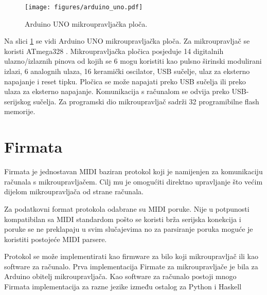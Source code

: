 \begin{figure}[H]
\centering
\texttt{[image: figures/arduino\_uno.pdf]}
\caption{Arduino UNO mikroupravljačka ploča.\protect\footnotemark}
\label{fig:arduino}
\end{figure}


Na slici \ref{fig:arduino} se vidi Arduino UNO mikroupravljačka ploča. Za
mikroupravljač se koristi ATmega328 \cite{atmega}. Mikroupravljačka pločica posjeduje 14
digitalnih ulazno/izlaznih pinova od kojih se 6 mogu koristiti kao pulsno
širinski modulirani izlazi, 6 analognih ulaza, \unit{16}{\mega\hertz} keramički
oscilator, USB sučelje, ulaz za eksterno napajanje i reset tipku. Pločica se
može napajati preko USB sučelja ili preko ulaza za eksterno napajanje.
Komunikacija s računalom se odvija preko USB-serijskog sučelja. Za programski
dio mikroupravljač sadrži \unit{32}{\kilo\byte} programibilne flash memorije.

\newpage
\section{Firmata}

Firmata je jednostavan MIDI baziran protokol koji je namijenjen za komunikaciju
računala s mikroupravljačem. Cilj mu je omogućiti direktno upravljanje što većim
dijelom mikroupravljača od strane računala.

Za podatkovni format protokola odabrane su MIDI \cite{midi} poruke. Nije u
potpunosti kompatibilan sa MIDI standardom pošto se koristi brža serijska
konekcija i poruke se ne preklapaju u svim slučajevima no za parsiranje poruka
moguće je koristiti postojeće MIDI parsere.

Protokol se može implementirati kao firmware za bilo koji mikroupravljač ili kao
software za računalo. Prva implementacija Firmate za mikroupravljače je bila za
Arduino obitelj mikroupravljača. Kao software za računalo postoji mnogo
Firmata implementacija za razne jezike između ostalog za Python \cite{pyfirmata}
i Haskell \cite{harduino}

